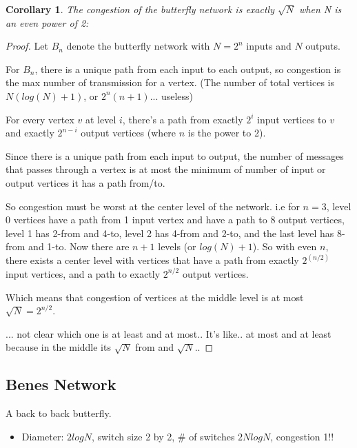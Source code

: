 \documentclass[10pt]{article}
\newtheorem{corollary}[theorem]{Corollary}
\begin{document}
\begin{corollary}The congestion of the butterfly network is exactly
  $\sqrt{N}$ when N is an even power of 2:
\end{corollary}
\begin{proof}
Let $B_n$ denote the butterfly network with $N=2^n$ inputs and $N$ outputs.

For $B_n$, there is a unique path from each input to each output,
so congestion is the max number of transmission for a vertex.
(The number of total vertices is $N(log(N)+1)$, or $2^n(n+1)$... useless)

For every vertex $v$ at level $i$, there's a path from exactly $2^i$
input vertices to $v$ and exactly $2^{n-i}$ output vertices (where $n$
is the power to 2).


Since there is a unique path from each input to output,  the number of
messages that passes through a vertex is at most the minimum of number
of input or output vertices it has a path from/to. 
 
So congestion must be worst at the center level of the
network. i.e for $n=3$, level 0 vertices have a path from 1 input
vertex and have a path to 8 output vertices, level 1 has 2-from and
4-to, level 2 has 4-from and 2-to, and the last level has 8-from and
1-to. Now there are $n+1$ levels (or $log(N)+1$). So with even $n$,
there exists a center level with vertices that have a path from exactly $2^{(n/2)}$
input vertices, and a path to exactly $2^{n/2}$ output vertices.

Which means that congestion of vertices at the middle level is at most
$\sqrt{N} = 2^{n/2}$. 

... not clear which one is at least and at most.. It's like.. at most
and at least because in the middle its $\sqrt{N}$ from and
$\sqrt{N}$..
 \end{proof}

\subsection{Benes Network}
A back to back butterfly.
\begin{itemize}
\item Diameter: $2logN$, switch size 2 by 2, \# of switches $2NlogN$,
  congestion 1!!
\end{itemize}
\end{document}
